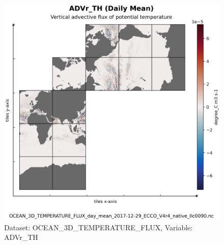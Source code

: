 \begin{figure}[H]
\centering
\includegraphics[scale=0.55]{../images/plots/native_plots/Ocean_Three-Dimensional_Potential_Temperature_Fluxes/ADVr_TH.png}
\caption{Dataset: OCEAN\_3D\_TEMPERATURE\_FLUX, Variable: ADVr\_TH}
\label{tab:table-OCEAN_3D_TEMPERATURE_FLUX_ADVr_TH-Plot}
\end{figure}
\pagebreak
